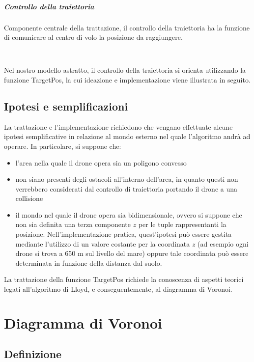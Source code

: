 \documentclass[11pt,a4paper]{report}
\newcommand{\name}[1]{{\ttfamily #1}}
\begin{document}
\paragraph{Controllo della traiettoria}

Componente centrale della trattazione, il controllo della traiettoria ha la funzione di comunicare al centro di volo la posizione da raggiungere.

\

Nel nostro modello astratto, il controllo della traiettoria si orienta utilizzando la funzione \name{TargetPos}, la cui ideazione e implementazione viene illustrata in seguito.

\section{Ipotesi e semplificazioni}

La trattazione e l'implementazione richiedono che vengano effettuate alcune ipotesi semplificative in relazione al mondo esterno nel quale l'algoritmo andrà ad operare. In particolare, si suppone che:

\begin{itemize}
	\item l'area nella quale il drone opera sia un poligono convesso
	\item non siano presenti degli ostacoli all'interno dell'area, in quanto questi non verrebbero considerati dal controllo di traiettoria portando il drone a una collisione
	\item il mondo nel quale il drone opera sia bidimensionale, ovvero si suppone che non sia definita una terza componente $z$ per le tuple rappresentanti la posizione. Nell'implementazione pratica, quest'ipotesi può essere gestita mediante l'utilizzo di un valore costante per la coordinata $z$ (ad esempio ogni drone si trova a 650 m sul livello del mare) oppure tale coordinata può essere determinata in funzione della distanza dal suolo.
\end{itemize}

La trattazione della funzione \name{TargetPos} richiede la conoscenza di aspetti teorici legati all'algoritmo di Lloyd, e conseguentemente, al diagramma di Voronoi.

\chapter{Diagramma di Voronoi}

\section{Definizione}
\end{document}

